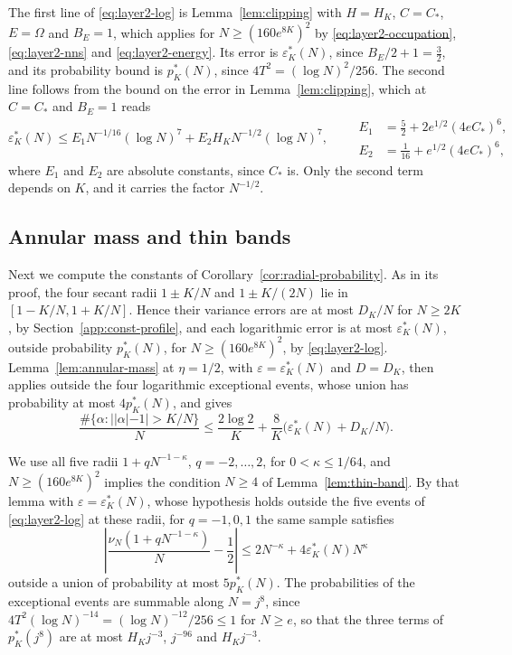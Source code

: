 The first line of \eqref{eq:layer2-log} is Lemma~\ref{lem:clipping} with
$H=H_K$, $C=C_*$, $E=\Omega$ and $B_E=1$, which applies for
$N\ge(160e^{8K})^2$ by \eqref{eq:layer2-occupation}, \eqref{eq:layer2-nns}
and \eqref{eq:layer2-energy}. Its error is $\varepsilon_K^*(N)$, since
$B_E/2+1=\tfrac32$, and its probability bound is $p_K^*(N)$, since
$4T^2=(\log N)^2/256$.
The second line follows from the bound on the error in
Lemma~\ref{lem:clipping}, which at $C=C_*$ and $B_E=1$ reads
\begin{equation}
 \varepsilon_K^*(N)\le E_1N^{-1/16}(\log N)^7+E_2H_KN^{-1/2}(\log N)^7,
 \qquad
 \begin{aligned}
 E_1&=\tfrac52+2e^{1/2}(4eC_*)^6,\\
 E_2&=\tfrac1{16}+e^{1/2}(4eC_*)^6,
 \end{aligned}
 \label{eq:layer2-log-split}
\end{equation}
where $E_1$ and $E_2$ are absolute constants, since $C_*$ is. Only the
second term depends on $K$, and it carries the factor $N^{-1/2}$.

\subsection{Annular mass and thin bands}\label{app:const-radial}
Next we compute the constants of
Corollary~\ref{cor:radial-probability}.
As in its proof, the four secant radii $1\pm K/N$ and $1\pm K/(2N)$ lie
in $[1-K/N,1+K/N]$. Hence
their variance errors are at most $D_K/N$ for $N\ge2K$, by
Section~\ref{app:const-profile}, and each logarithmic error is at most
$\varepsilon_K^*(N)$, outside probability $p_K^*(N)$, for
$N\ge(160e^{8K})^2$, by \eqref{eq:layer2-log}.
Lemma~\ref{lem:annular-mass} at $\eta=1/2$, with
$\varepsilon=\varepsilon_K^*(N)$ and $D=D_K$, then applies outside the
four logarithmic exceptional events, whose union has probability at most
$4p_K^*(N)$, and gives
\begin{equation}
 \frac{\#\{\alpha:||\alpha|-1|>K/N\}}N
 \le\frac{2\log2}{K}+\frac8K\bigl(\varepsilon_K^*(N)+D_K/N\bigr).
 \label{eq:layer2-radial}
\end{equation}

We use all five radii $1+qN^{-1-\kappa}$, $q=-2,\dots,2$, for
$0<\kappa\le1/64$, and $N\ge(160e^{8K})^2$ implies the condition $N\ge4$
of Lemma~\ref{lem:thin-band}. By that lemma with
$\varepsilon=\varepsilon_K^*(N)$, whose hypothesis holds outside the five
events of \eqref{eq:layer2-log} at these radii, for $q=-1,0,1$ the same
sample satisfies
\begin{equation}
 \left|\frac{\nu_N(1+qN^{-1-\kappa})}N-\frac12\right|
 \le2N^{-\kappa}+4\varepsilon_K^*(N)N^\kappa
 \label{eq:radial-count-near-unit}
\end{equation}
outside a union of probability at most $5p_K^*(N)$.
The probabilities of the exceptional events are summable along $N=j^8$,
since $4T^2(\log N)^{-14}=(\log N)^{-12}/256\le1$ for $N\ge e$, so that
the three terms of $p_K^*(j^8)$ are at most $H_Kj^{-3}$, $j^{-96}$ and
$H_Kj^{-3}$.

